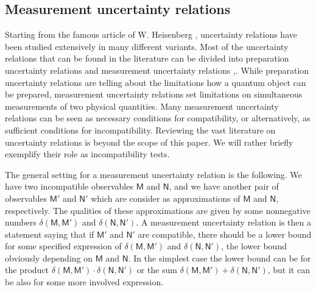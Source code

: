 \documentclass[12pt]{iopart}
\theoremstyle{definition}
\newcommand{\Mo}{\mathsf{M}}%
\newcommand{\No}{\mathsf{N}}%
\begin{document}
\subsection{Measurement uncertainty relations}\label{sec:ur}

Starting from the famous article of W. Heisenberg \cite{Heisenberg27}, uncertainty relations have been studied extensively in many different variants.
Most of the uncertainty relations that can be found in the literature can be divided into preparation uncertainty relations and measurement uncertainty relations \cite{BuHeLa07},\cite{Muynck00}.
While preparation uncertainty relations are telling about the limitations how a quantum object can be prepared, measurement uncertainty relations set limitations on simultaneous measurements of two physical quantities.  
Many measurement uncertainty relations can be seen as necessary conditions for compatibility, or alternatively, as sufficient conditions for incompatibility. 
Reviewing the vast literature on uncertainty relations is beyond the scope of this paper. 
We will rather briefly exemplify their role as incompatibility tests.

The general setting for a measurement uncertainty relation is the following. 
We have two incompatible observables $\Mo$ and $\No$, and we have another pair of observables $\Mo'$ and $\No'$ which are consider as approximations of $\Mo$ and $\No$, respectively.
The qualities of these approximations are given by some 
nonnegative numbers $\delta(\Mo,\Mo')$ and $\delta(\No,\No')$. 
A measurement uncertainty relation is then a statement saying that if $\Mo'$ and $\No'$ are compatible, there should be a lower bound for some specified expression of $\delta(\Mo, \Mo')$ and $\delta(\No, \No')$, the lower bound obviously depending on $\Mo$ and $\No$.
In the simplest case the lower bound can be for the product $\delta(\Mo,\Mo')\cdot\delta(\No,\No')$ or the sum $\delta(\Mo,\Mo')+\delta(\No,\No')$, but it can be also for some more involved expression. 
\end{document}

